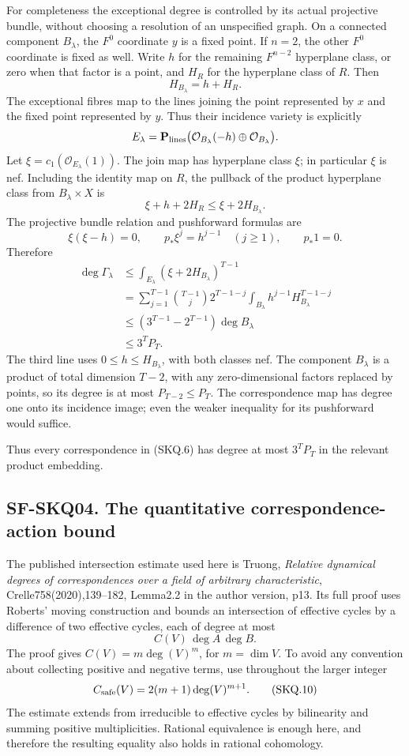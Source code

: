 For completeness the exceptional degree is controlled by its actual
projective bundle, without choosing a resolution of an unspecified
graph. On a connected component \(B_\lambda\), the \(F^0\) coordinate
\(y\) is a fixed point. If \(n=2\), the other \(F^0\) coordinate is
fixed as well. Write \(h\) for the remaining \(F^{n-2}\) hyperplane
class, or zero when that factor is a point, and \(H_R\) for the
hyperplane class of \(R\). Then \[
 H_{B_\lambda}=h+H_R.
\] The exceptional fibres map to the lines joining the point represented
by \(x\) and the fixed point represented by \(y\). Thus their incidence
variety is explicitly \[
 E_\lambda=
 \mathbf P_{\rm lines}\bigl(\mathcal O_{B_\lambda}(-h)
                              \oplus\mathcal O_{B_\lambda}\bigr).
\] Let \(\xi=c_1(\mathcal O_{E_\lambda}(1))\). The join map has
hyperplane class \(\xi\); in particular \(\xi\) is nef. Including the
identity map on \(R\), the pullback of the product hyperplane class from
\(B_\lambda\times X\) is \[
 \xi+h+2H_R\le\xi+2H_{B_\lambda}.
\] The projective bundle relation and pushforward formulas are \[
 \xi(\xi-h)=0,\qquad
 p_*\xi^j=h^{j-1}\quad(j\ge1),\qquad p_*1=0.
\] Therefore \[
 \begin{aligned}
 \deg\Gamma_\lambda
 &\le\int_{E_\lambda}(\xi+2H_{B_\lambda})^{T-1}\\
 &=\sum_{j=1}^{T-1}
       \binom{T-1}{j}2^{T-1-j}
       \int_{B_\lambda}h^{j-1}H_{B_\lambda}^{T-1-j}\\
 &\le(3^{T-1}-2^{T-1})\deg B_\lambda\\
 &\le3^TP_T.
 \end{aligned}
 \tag{SKQ.9}
\] The third line uses \(0\le h\le H_{B_\lambda}\), with both classes
nef. The component \(B_\lambda\) is a product of total dimension
\(T-2\), with any zero-dimensional factors replaced by points, so its
degree is at most \(P_{T-2}\le P_T\). The correspondence map has degree
one onto its incidence image; even the weaker inequality for its
pushforward would suffice.

Thus every correspondence in (SKQ.6) has degree at most \(3^TP_T\) in
the relevant product embedding.

\subsection{SF-SKQ04. The quantitative correspondence-action
bound}\label{SF-SKQ04}

The published intersection estimate used here is Truong, \emph{Relative
dynamical degrees of correspondences over a field of arbitrary
characteristic}, Crelle758(2020),139--182, Lemma2.2 in the author
version, p13. Its full proof uses Roberts' moving construction and
bounds an intersection of effective cycles by a difference of two
effective cycles, each of degree at most \[
 C(V)\,\deg A\,\deg B.
\] The proof gives \(C(V)=m\deg(V)^m\), for \(m=\dim V\). To avoid any
convention about collecting positive and negative terms, use throughout
the larger integer \[
 C_{\rm safe}(V)=2(m+1)\deg(V)^{m+1}.
 \tag{SKQ.10}
\] The estimate extends from irreducible to effective cycles by
bilinearity and summing positive multiplicities. Rational equivalence is
enough here, and therefore the resulting equality also holds in rational
cohomology.

